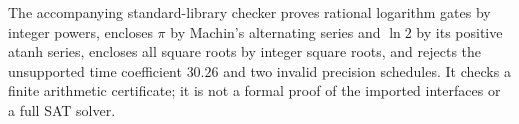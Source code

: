 The accompanying standard-library checker proves rational logarithm gates
by integer powers, encloses $\pi$ by Machin's alternating series and
$\ln2$ by its positive atanh series, encloses all square roots by integer
square roots, and rejects the unsupported time coefficient $30.26$ and two
invalid precision schedules. It checks a finite arithmetic certificate;
it is not a formal proof of the imported interfaces or a full SAT solver.
